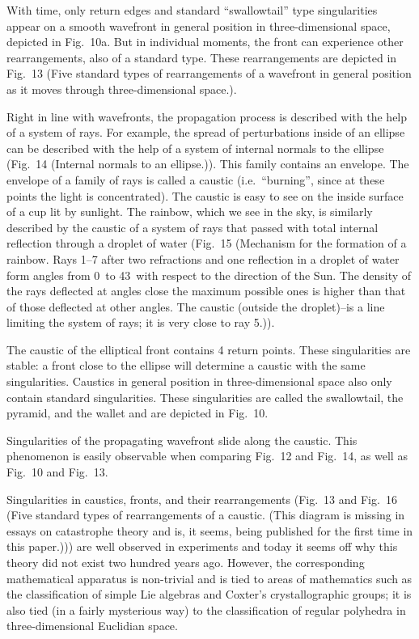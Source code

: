 \documentclass[12pt]{amsart}
\begin{document}
With time, only return edges and standard ``swallowtail'' type singularities
appear on a smooth wavefront in general position in three-dimensional space,
depicted in Fig.\ 10a.
But in individual moments, the front can experience other rearrangements, also
of a standard type.
These rearrangements are depicted in Fig.\ 13 (Five standard types of
rearrangements of a wavefront in general position as it moves through
three-dimensional space.).

Right in line with wavefronts, the propagation process is described with the
help of a system of rays.
For example, the spread of perturbations inside of an ellipse can be described
with the help of a system of internal normals to the ellipse (Fig.\ 14 (Internal
normals to an ellipse.)).
This family contains an envelope.
The envelope of a family of rays is called a caustic (i.e.\ ``burning'', since
at these points the light is concentrated).
The caustic is easy to see on the inside surface of a cup lit by sunlight.
The rainbow, which we see in the sky, is similarly described by the caustic of a
system of rays that passed with total internal reflection through a droplet of
water (Fig.\ 15 (Mechanism for the formation of a rainbow.
Rays 1--7 after two refractions and one reflection in a droplet of water form
angles from 0\degree\ to 43\degree\ with respect to the direction of the Sun.
The density of the rays deflected at angles close the maximum possible ones is
higher than that of those deflected at other angles.
The caustic (outside the droplet)--is a line limiting the system of rays; it is
very close to ray 5.)).

The caustic of the elliptical front contains 4 return points.
These singularities are stable: a front close to the ellipse will determine a
caustic with the same singularities.
Caustics in general position in three-dimensional space also only contain
standard singularities.
These singularities are called the swallowtail, the pyramid, and the wallet and
are depicted in Fig.\ 10.

Singularities of the propagating wavefront slide along the caustic.
This phenomenon is easily observable when comparing Fig.\ 12 and Fig.\ 14, as well
as Fig.\ 10 and Fig.\ 13.

Singularities in caustics, fronts, and their rearrangements (Fig.\ 13 and Fig.\
16 (Five standard types of rearrangements of a caustic.
(This diagram is missing in essays on catastrophe theory and is, it seems, being
published for the first time in this paper.))) are well observed in experiments
and today it seems off why this theory did not exist two hundred years ago.
However, the corresponding mathematical apparatus is non-trivial and is tied to
areas of mathematics such as the classification of simple Lie algebras and
Coxter's crystallographic groups; it is also tied (in a fairly mysterious way)
to the classification of regular polyhedra in three-dimensional Euclidian
space.\\
\end{document}
